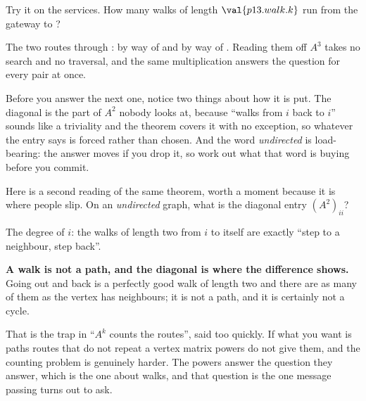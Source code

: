 \begin{fr}
Try it on the services. How many walks of length $\val{p13.walk.k}$ run from
the gateway to ?
\nextframe
\end{fr}

\begin{fr}
The two routes through : by way of  and by way of
. Reading them off $A^{3}$ takes no search and no traversal, and
the same multiplication answers the question for every pair at once.

Before you answer the next one, notice two things about how it is put. The
diagonal is the part of $A^{2}$ nobody looks at, because \enquote{walks from
$i$ back to $i$} sounds like a triviality \dash{} and the theorem covers it
with no exception, so whatever the entry says is forced rather than chosen.
And the word \emph{undirected} is load-bearing: the answer moves if you drop
it, so work out what that word is buying before you commit.

Here is a second reading of the same theorem, worth a moment because it is
where people slip. On an \emph{undirected} graph, what is the diagonal entry
$(A^{2})_{ii}$?
\dotline
\nextframe
\end{fr}

\begin{fr}
\begin{ansblock}
The degree of $i$: the walks of length two from $i$ to itself are exactly
\enquote{step to a neighbour, step back}.
\end{ansblock}

\begin{trapbox}
\textbf{A walk is not a path, and the diagonal is where the difference shows.}
Going out and back is a perfectly good walk of length two and there are as
many of them as the vertex has neighbours; it is not a path, and it is
certainly not a cycle.

That is the trap in \enquote{$A^{k}$ counts the routes}, said too quickly. If
what you want is paths \dash{} routes that do not repeat a vertex \dash{}
matrix powers do not give them, and the counting problem is genuinely harder.
The powers answer the question they answer, which is the one about walks, and
that question is the one message passing turns out to ask.
\end{trapbox}

\end{fr}

